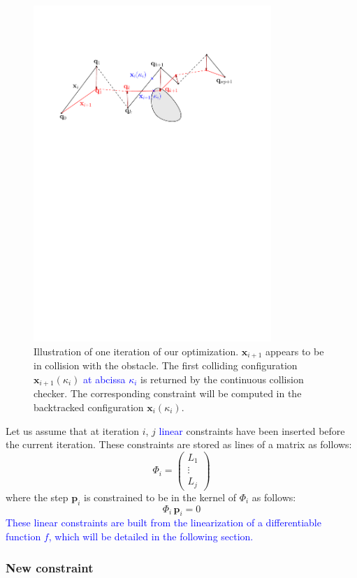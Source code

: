 \documentclass{tADR2e}
\newcommand\p{\mathbf{p}}
\newcommand\xx{\mathbf{x}} %
\newcommand\tcolli{\kappa_i}
\newcommand\Jf{\Phi}
\begin{document}
\begin{figure}
	\centering
	\includegraphics[width=9cm]{optim_grad.pdf}
	\caption{Illustration of one iteration of our optimization.
	$\xx_{i+1}$ appears 
	to be in collision with the obstacle. The first colliding configuration 
	$\xx_{i+1}(\tcolli)$ \textcolor{blue}{at abcissa $\tcolli$} is returned by 
	the continuous collision checker. The 
	corresponding constraint will be computed in the backtracked configuration 
	$\xx_{i}(\tcolli)$.}
	\label{optim_grad}
\end{figure}

Let us assume that at iteration $i$, $j$ \textcolor{blue}{linear} constraints have been inserted before the current iteration. 
These constraints are stored as lines of a matrix as follows:
$$
\Jf_{i} = \left(\begin{array}{c}L_1 \\ \vdots \\ L_j\end{array}\right)
$$
where the step $\p_i$ is constrained to be in the kernel of $\Jf_{i}$ as follows:
$$
\Jf_{i} \, \p_i = 0
$$
\textcolor{blue}{These linear constraints are built from the linearization of a differentiable function $f$, which will be detailed in the following section.}

\subsubsection{New constraint}
\end{document}

